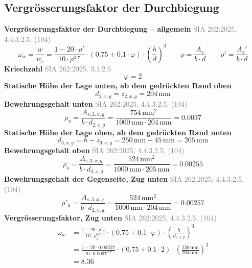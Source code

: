 \documentclass[11pt,a4paper]{article}
\newcommand{\normref}[1]{{\small\textcolor{gray}{#1}}}
\begin{document}
\subsection{Vergrösserungsfaktor der Durchbiegung}
\noindent\textbf{Vergrösserungsfaktor der Durchbiegung – allgemein} \hfill \normref{SIA 262:2025, 4.4.3.2.5, (104)}
\begin{equation*}
\omega_w = \frac{w}{w_c} = \frac{1 - 20 \cdot \rho'}{10 \cdot \rho^{0.7}} \cdot \left(0.75 + 0.1 \cdot \varphi\right) \cdot \left(\frac{h}{d}\right)^{3} \qquad \rho = \frac{A_s}{b \cdot d} \qquad \rho' = \frac{A_s'}{b \cdot d}
\end{equation*}
\noindent\textbf{Kriechzahl} \hfill \normref{SIA 262:2025, 3.1.2.6}
\begin{equation*}
\varphi = 2
\end{equation*}
\noindent\textbf{Statische Höhe der Lage unten, ab dem gedrückten Rand oben}
\begin{equation*}
d_{2,x,g} = z_{2,x,g} = 204\,\mathrm{mm}
\end{equation*}
\noindent\textbf{Bewehrungsgehalt unten} \hfill \normref{SIA 262:2025, 4.4.3.2.5, (104)}
\begin{equation*}
\rho_{u} = \frac{A_{s,2,x,g}}{b \cdot d_{2,x,g}} = \frac{754\,\mathrm{mm}^{2}}{1000\,\mathrm{mm} \cdot 204\,\mathrm{mm}} = 0.0037
\end{equation*}
\noindent\textbf{Statische Höhe der Lage oben, ab dem gedrückten Rand unten}
\begin{equation*}
d_{3,x,g} = h - z_{3,x,g} = 250\,\mathrm{mm} - 45\,\mathrm{mm} = 205\,\mathrm{mm}
\end{equation*}
\noindent\textbf{Bewehrungsgehalt oben} \hfill \normref{SIA 262:2025, 4.4.3.2.5, (104)}
\begin{equation*}
\rho_{o} = \frac{A_{s,3,x,g}}{b \cdot d_{3,x,g}} = \frac{524\,\mathrm{mm}^{2}}{1000\,\mathrm{mm} \cdot 205\,\mathrm{mm}} = 0.00255
\end{equation*}
\noindent\textbf{Bewehrungsgehalt der Gegenseite, Zug unten} \hfill \normref{SIA 262:2025, 4.4.3.2.5, (104)}
\begin{equation*}
\rho'_{u} = \frac{A_{s,3,x,g}}{b \cdot d_{2,x,g}} = \frac{524\,\mathrm{mm}^{2}}{1000\,\mathrm{mm} \cdot 204\,\mathrm{mm}} = 0.00257
\end{equation*}
\noindent\textbf{Vergrösserungsfaktor, Zug unten} \hfill \normref{SIA 262:2025, 4.4.3.2.5, (104)}
\begin{equation*}
\begin{aligned}
  \omega_w &= \frac{1 - 20 \cdot \rho'_{u}}{10 \cdot \rho_{u}^{0.7}} \cdot \left(0.75 + 0.1 \cdot \varphi\right) \cdot \left(\frac{h}{d_{2,x,g}}\right)^{3} \\
  &= \frac{1 - 20 \cdot 0.00257}{10 \cdot 0.0037^{0.7}} \cdot \left(0.75 + 0.1 \cdot 2\right) \cdot \left(\frac{250\,\mathrm{mm}}{204\,\mathrm{mm}}\right)^{3} \\
  &= 8.36
\end{aligned}
\end{equation*}
\end{document}
